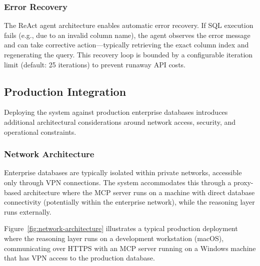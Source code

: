 \subsubsection{Error Recovery}

The ReAct agent architecture enables automatic error recovery. If SQL execution fails (e.g., due to an invalid column name), the agent observes the error message and can take corrective action---typically retrieving the exact column index and regenerating the query. This recovery loop is bounded by a configurable iteration limit (default: 25 iterations) to prevent runaway API costs.

\subsection{Production Integration}
\label{subsec:production-integration}

Deploying the system against production enterprise databases introduces additional architectural considerations around network access, security, and operational constraints.

\subsubsection{Network Architecture}

Enterprise databases are typically isolated within private networks, accessible only through VPN connections. The system accommodates this through a proxy-based architecture where the MCP server runs on a machine with direct database connectivity (potentially within the enterprise network), while the reasoning layer runs externally.

Figure~\ref{fig:network-architecture} illustrates a typical production deployment where the reasoning layer runs on a development workstation (macOS), communicating over HTTPS with an MCP server running on a Windows machine that has VPN access to the production database.

